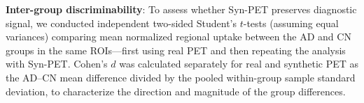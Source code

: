 \item \textbf{Inter-group discriminability}: To assess whether Syn-PET preserves diagnostic signal, we conducted independent two-sided Student's $t$-tests (assuming equal variances) comparing mean normalized regional uptake between the AD and CN groups in the same ROIs—first using real PET and then repeating the analysis with Syn-PET. Cohen's $d$ was calculated separately for real and synthetic PET as the AD--CN mean difference divided by the pooled within-group sample standard deviation, to characterize the direction and magnitude of the group differences.
